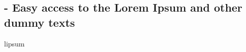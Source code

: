 
\subsection{ - Easy access to the Lorem Ipsum and other dummy texts}

\begin{demo}{}{lipsum}
  \lipsum[1]
\end{demo}
